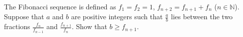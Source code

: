 The Fibonacci sequence is defined as $f_1=f_2=1$, $f_{n+2}=f_{n+1}+f_n$ ($n\in\mathbb{N}$). Suppose that $a$ and $b$ are positive integers such that $\frac ab$ lies between the two fractions $\frac{f_n}{f_{n-1}}$ and $\frac{f_{n+1}}{f_{n}}$. Show that $b\ge f_{n+1}$.